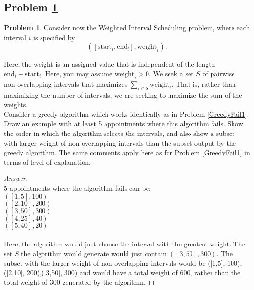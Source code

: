 \documentclass[11pt]{article}
\theoremstyle{definition}
\theoremstyle{definition}
\newtheorem{required}{Problem}
\theoremstyle{definition}
\begin{document}
\newpage
\subsection{Problem \ref{GreedyFail3}}
\begin{required} \label{GreedyFail3}
Consider now the \textsf{Weighted Interval Scheduling} problem, where each interval $i$ is specified by 
\[
([\text{start}_{i}, \text{end}_{i}], \text{weight}_{i}). 
\]

\noindent Here, the weight is an assigned value that is independent of the length $\text{end}_{i} - \text{start}_{i}$. Here, you may assume $\text{weight}_{i} > 0$. We seek a set $S$ of pairwise non-overlapping intervals that maximizes $\sum_{i \in S} \text{weight}_{i}$. That is, rather than maximizing the number of intervals, we are seeking to maximize the sum of the weights. \\

\noindent Consider a greedy algorithm which works identically as in Problem \ref{GreedyFail1}. Draw an example with at least 5 appointments where this algorithm fails. Show the order in which the algorithm selects the intervals, and also show a subset with larger weight of non-overlapping intervals than the subset output by the greedy algorithm. The same comments apply here as for Problem \ref{GreedyFail1} in terms of level of explanation.
\end{required}

\begin{proof}[Answer]
\\
5 appointments where the algorithm fails can be: \\
$([1,5], 100)$ \\
$([2,10], 200)$ \\
$([3,50], 300)$ \\
$([4,25], 40)$ \\
$([5,40], 20)$ 
\\
\\
Here, the algorithm would just choose the interval with the greatest weight. The set $S$ the algorithm would generate would just contain $([3,50], 300)$. The subset with the larger weight of non-overlapping intervals would be {([1,5], 100),([2,10], 200),([3,50], 300)} and would have a total weight of 600, rather than the total weight of 300 generated by the algorithm.

\end{proof}




\newpage
\end{document}
